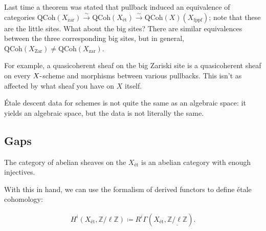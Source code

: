 \begin{remark}

Last time a theorem was stated that pullback induced an equivalence of
categories
\({\mathrm{QCoh}}(X_{{\mathrm{zar}}}) \xrightarrow{\sim} {\mathrm{QCoh}}(X_{\text{ét}}) \xrightarrow{\sim} {\mathrm{QCoh}}(X)(X_{\mathrm{\operatorname{fppf}}})\);
note that these are the little sites. What about the big sites? There
are similar equivalences between the three corresponding big sites, but
in general,
\({\mathrm{QCoh}}(X_{{\mathrm{Zar}}}) \neq {\mathrm{QCoh}}(X_{{\mathrm{zar}}})\).

For example, a quasicoherent sheaf on the big Zariski site is a
quasicoherent sheaf on every \(X{\hbox{-}}\)scheme and morphisms between
various pullbacks. This isn't as affected by what sheaf you have on
\(X\) itself.

\end{remark}

\begin{remark}

Étale descent data for schemes is not quite the same as an algebraic
space: it yields an algebraic space, but the data is not literally the
same.

\end{remark}

\hypertarget{gaps}{%
\subsection{Gaps}\label{gaps}}

\begin{claim}

The category of abelian sheaves on the \(X_{\text{ét}}\) is an abelian
category with enough injectives.

\end{claim}

With this in hand, we can use the formalism of derived functors to
define étale cohomology:

\begin{definition}\label{def:etale_cohomology}

\begin{align*}  
H^i(X_\text{ét}, \mathbb{Z}/\ell\mathbb{Z}) \coloneqq R^i \Gamma(X_\text{ét}, \underline{ \mathbb{Z}/\ell\mathbb{Z}} )
.\end{align*}

\end{definition}

